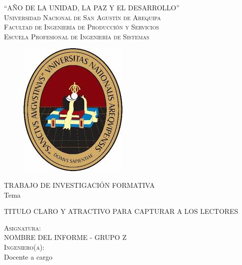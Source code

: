 \documentclass[oneside,letterpaper]{article}            %
\newcommand{\itemYear}{AÑO DE LA UNIDAD, LA PAZ Y EL DESARROLLO}
\newcommand{\itemRType}{TRABAJO DE INVESTIGACIÓN FORMATIVA}
\newcommand{\itemCourseG}{NOMBRE DEL INFORME - GRUPO Z}
\newcommand{\itemTheme}{TITULO CLARO Y ATRACTIVO PARA CAPTURAR A LOS LECTORES}
\newcommand{\itemTeacher}{Docente a cargo}
\begin{document}
\begin{titlepage}
    \centering
    \begin{spacing}{1.7}
        \Large{``\itemYear''}\\ %
        \Large {\textsc{Universidad Nacional de San Agustín de Arequipa}}\\ 
        \large{\textsc{Facultad de Ingeniería de Producción  y Servicios}\\
        \textsc{Escuela Profesional de Ingeniería de Sistemas}}
        \normalsize
    \end{spacing}
    
    \vspace{0.5cm}
    
    \begin{figure}[h!]
        \begin{center}
            \includegraphics[scale=0.67]{images/IN.jpg} 
        \end{center}
    \end{figure}
    
    \itemRType\\ %
    \vspace{0.35cm}
    Tema\\
    \vspace{0.5cm}
    \begin{spacing}{1}
        \Large{\textsc{\itemTheme}}
    \end{spacing}
    \vspace{0.5cm}
    \textsc{Asignatura:}\\\vspace{0.35cm}
    \itemCourseG
    \\\vspace{0.5cm}
    \textsc{Ingeniero(a):}\\\vspace{0.35cm}
    \itemTeacher
    

\end{titlepage}
\end{document}
